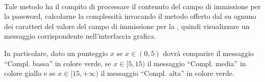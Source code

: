 \begin{description}
  \item{}\\
  Tale metodo ha il compito di processare il contenuto del campo di immissione per la password, calcolarne la complessità invocando il metodo  offerto dal  su ognuno dei caratteri del valore del campo di immissione per la , quindi visualizzare un messaggio corrispondente nell'interfaccia grafica.
  
  In particolare, dato un punteggio $x$ se $x \in (0, 5)$ dovrà comparire il messaggio ``Compl. bassa'' in colore verde, se $x \in [5, 15)$ il messaggio ``Compl. media'' in colore giallo e se $x \in [15, +\infty)$ il messaggio ``Compl. alta'' in colore verde.

\end{description}

